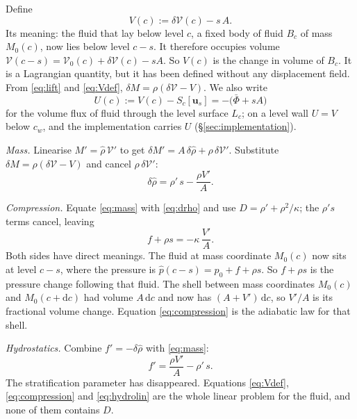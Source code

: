 \documentclass[11pt]{article}
\theoremstyle{definition}
\theoremstyle{remark}
\newcommand{\bu}{\mathbf{u}}
\newcommand{\dc}{\,\mathrm{d}c}
\newcommand{\Vol}{\mathcal V}
\begin{document}
Define
\begin{equation}
  V(c) := \delta\Vol(c) - s\,A .
  \label{eq:Vdef}
\end{equation}
Its meaning: the fluid that lay below level $c$, a fixed body of fluid
$B_c$ of mass $M_0(c)$, now lies below level $c - s$. It therefore
occupies volume $\Vol(c - s) = \Vol_0(c) + \delta\Vol(c) - sA$. So
$V(c)$ is the change in volume of $B_c$. It is a Lagrangian quantity,
but it has been defined without any displacement field. From
\eqref{eq:lift} and \eqref{eq:Vdef}, $\delta M = \rho(\delta\Vol - V)$.
We also write
\begin{equation*}
  U(c) := V(c) - S_c[\bu_s] = -\bigl(\bar\Phi + sA\bigr)
\end{equation*}
for the volume flux of fluid through the level surface $L_c$; on a
level wall $U = V$ below $c_w$, and the implementation carries $U$
(\S\ref{sec:implementation}).

\emph{Mass.} Linearise $M' = \hat\rho\,\Vol'$ to get $\delta M' =
A\,\delta\hat\rho + \rho\,\delta\Vol'$. Substitute $\delta M =
\rho(\delta\Vol - V)$ and cancel $\rho\,\delta\Vol'$:
\begin{equation}
  \delta\hat\rho = \rho'\,s - \frac{\rho V'}{A} .
  \label{eq:mass}
\end{equation}

\emph{Compression.} Equate \eqref{eq:mass} with \eqref{eq:drho} and use
$D = \rho' + \rho^2/\kappa$; the $\rho's$ terms cancel, leaving
\begin{equation}
  f + \rho s = -\kappa\,\frac{V'}{A} .
  \label{eq:compression}
\end{equation}
Both sides have direct meanings. The fluid at mass coordinate $M_0(c)$
now sits at level $c - s$, where the pressure is $\hat p(c - s) = p_0 +
f + \rho s$. So $f + \rho s$ is the pressure change following that
fluid. The shell between mass coordinates $M_0(c)$ and $M_0(c +
\mathrm dc)$ had volume $A\dc$ and now has $(A + V')\dc$, so $V'/A$ is
its fractional volume change. Equation \eqref{eq:compression} is the
adiabatic law for that shell.

\emph{Hydrostatics.} Combine $f' = -\delta\hat\rho$ with
\eqref{eq:mass}:
\begin{equation}
  f' = \frac{\rho V'}{A} - \rho'\,s .
  \label{eq:hydrolin}
\end{equation}
The stratification parameter has disappeared. Equations
\eqref{eq:Vdef}, \eqref{eq:compression} and \eqref{eq:hydrolin} are the
whole linear problem for the fluid, and none of them contains $D$.
\end{document}
